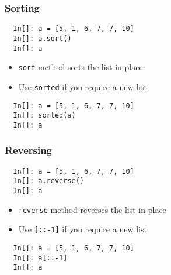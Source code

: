\begin{frame}[fragile]
  \frametitle{Sorting}
  \begin{lstlisting}
  In[]: a = [5, 1, 6, 7, 7, 10]
  In[]: a.sort()
  In[]: a
  \end{lstlisting}
  \begin{itemize}
  \item \texttt{sort} method sorts the list in-place
  \item Use \texttt{sorted} if you require a new list
  \end{itemize}
  \begin{lstlisting}
  In[]: a = [5, 1, 6, 7, 7, 10]
  In[]: sorted(a)
  In[]: a
  \end{lstlisting}
\end{frame}

\begin{frame}[fragile]
  \frametitle{Reversing}
  \begin{lstlisting}
  In[]: a = [5, 1, 6, 7, 7, 10]
  In[]: a.reverse()
  In[]: a
  \end{lstlisting}
  \begin{itemize}
  \item \texttt{reverse} method reverses the list in-place
  \item Use \texttt{[::-1]} if you require a new list
  \end{itemize}
  \begin{lstlisting}
  In[]: a = [5, 1, 6, 7, 7, 10]
  In[]: a[::-1]
  In[]: a
  \end{lstlisting}
\end{frame}
